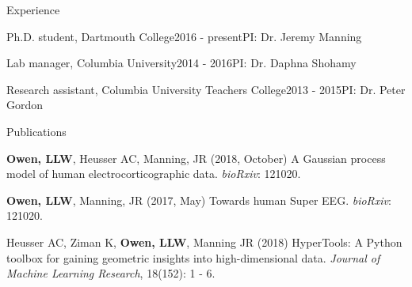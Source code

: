 \documentclass{resume} %
\begin{document}
\begin{rSection}{Experience}


\begin{rSubsection}{Ph.D. student, Dartmouth College}{2016 - present}{PI: Dr. Jeremy Manning}{}
\end{rSubsection}



\begin{rSubsection}{Lab manager, Columbia University}{2014 - 2016}{PI: Dr. Daphna Shohamy}{}
\end{rSubsection}



\begin{rSubsection}{Research assistant, Columbia University Teachers College}{2013 - 2015}{PI: Dr. Peter Gordon}{}
\end{rSubsection}

\end{rSection}


\begin{rSection}{Publications} \itemsep -2pt

\item \textbf{Owen, LLW}, Heusser AC, Manning, JR (2018, October) A Gaussian process model of human electrocorticographic data. \textit{bioRxiv}: 121020.


\item \textbf{Owen, LLW}, Manning, JR (2017, May) Towards human Super EEG.
\textit{bioRxiv}: 121020.

\item Heusser AC, Ziman K, \textbf{Owen, LLW}, Manning JR (2018) HyperTools: A Python toolbox for gaining geometric insights into high-dimensional data. \textit{Journal of Machine Learning Research}, 18(152): 1 - 6.


\end{rSection}


\end{document}
